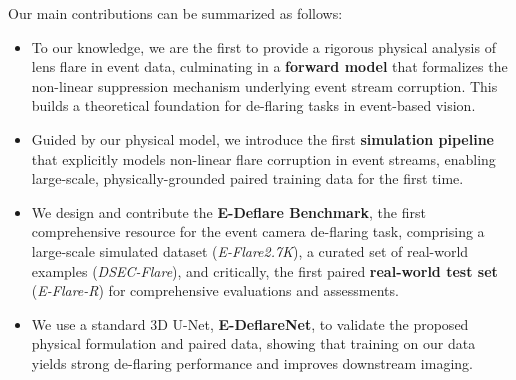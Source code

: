 Our main contributions can be summarized as follows:
\begin{itemize}
    \item To our knowledge, we are the first to provide a rigorous physical analysis of lens flare in event data, culminating in a \textbf{forward model} that formalizes the non-linear suppression mechanism underlying event stream corruption. This builds a theoretical foundation for de-flaring tasks in event-based vision.

    \item Guided by our physical model, we introduce the first \textbf{simulation pipeline} that explicitly models non-linear flare corruption in event streams, enabling large-scale, physically-grounded paired training data for the first time.

    \item We design and contribute the \textbf{E-Deflare Benchmark}, the first comprehensive resource for the event camera de-flaring task, comprising a large-scale simulated dataset (\emph{E-Flare2.7K}), a curated set of real-world examples (\emph{DSEC-Flare}), and critically, the first paired \textbf{real-world test set} (\emph{E-Flare-R}) for comprehensive evaluations and assessments.

    \item We use a standard 3D U-Net, \textbf{E-DeflareNet}, to validate the proposed physical formulation and paired data, showing that training on our data yields strong de-flaring performance and improves downstream imaging.
\end{itemize}



















